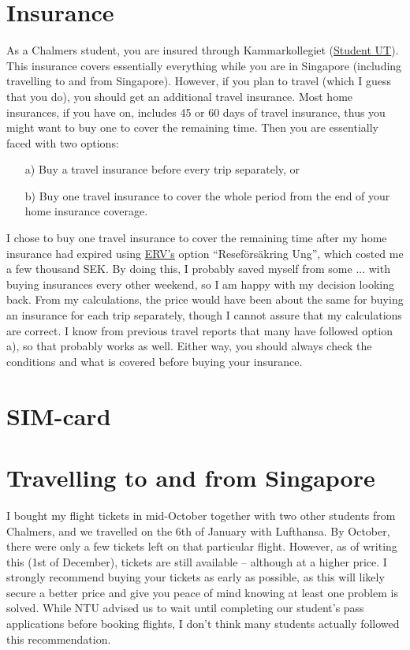 \section*{Insurance}
As a Chalmers student, you are insured through Kammarkollegiet (\href{https://www.kammarkollegiet.se/vara-tjanster/forsakring-och-riskhantering/forsakringar-for-studier-och-utlandska-besokare/utresande-utbytesstudenter-student-ut}{Student UT}). This insurance covers essentially everything while you are in Singapore (including travelling to and from Singapore). However, if you plan to travel (which I guess that you do), you should get an additional travel insurance. Most home insurances, if you have on, includes 45 or 60 days of travel insurance, thus you might want to buy one to cover the remaining time. Then you are essentially faced with two options:
\begin{itemize}
    \item[a)] Buy a travel insurance before every trip separately, or
    \item[b)] Buy one travel insurance to cover the whole period from the end of your home insurance coverage. 
\end{itemize}
I chose to buy one travel insurance to cover the remaining time after my home insurance had expired using \href{https://www.erv.se/privat/vara-reseforsakringar/reseforsakring-ung/}{ERV's} option ``Reseförsäkring Ung'', which costed me a few thousand SEK. By doing this, I probably saved myself from some ... with buying insurances every other weekend, so I am happy with my decision looking back. From my calculations, the price would have been about the same for buying an insurance for each trip separately, though I cannot assure that my calculations are correct. I know from previous travel reports that many have followed option a), so that probably works as well. Either way, you should always check the conditions and what is covered before buying your insurance.
\section*{SIM-card}
\section*{Travelling to and from Singapore}
I bought my flight tickets in mid-October together with two other students from Chalmers, and we travelled on the 6th of January with Lufthansa. By October, there were only a few tickets left on that particular flight. However, as of writing this (1st of December), tickets are still available -- although at a higher price. I strongly recommend buying your tickets as early as possible, as this will likely secure a better price and give you peace of mind knowing at least one problem is solved. While NTU advised us to wait until completing our student's pass applications before booking flights, I don't think many students actually followed this recommendation.

